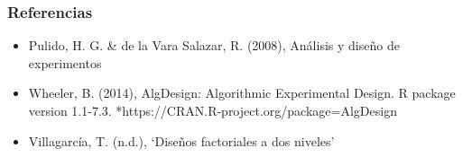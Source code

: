 \documentclass[12pt]{beamer}
\begin{document}
\begin{frame}
\frametitle{Referencias}
\begin{itemize}

Phoa, F. K., Xu, H. \& Wong, W. K. (2009), "The use of nonregular fractional factorial designs in combination toxicity studies", Food and Chemical Toxicology 47(9), 2183 - 2188. 
*http://www.sciencedirect.com/science/article/pii/S0278691509002701

\item Pulido, H. G. \& de la Vara Salazar, R. (2008), Análisis y diseño de experimentos


\item Wheeler, B. (2014), AlgDesign: Algorithmic Experimental Design. R package version 1.1-7.3. *https://CRAN.R-project.org/package=AlgDesign



\item Villagarcía, T. (n.d.), `Diseños factoriales a dos niveles'
\end{itemize}
\end{frame}
\end{document}
